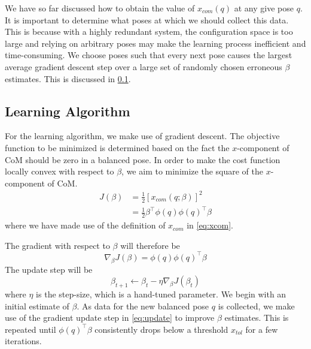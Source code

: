 \documentclass[letterpaper, 10 pt, conference]{ieeeconf}
\begin{document}
We have so far discussed how to obtain the value of $x_{com}(q)$ at any give
pose $q$. It is important to determine what poses at which we should collect
this data. This is because with a highly redundant system, the configuration
space is too large and relying on arbitrary poses may make the learning process
inefficient and time-consuming. We choose poses such that every next pose causes
the largest average gradient descent step over a large set of randomly chosen
erroneous $\beta$ estimates. This is discussed in \cref{subsec: learning}.


\subsection{Learning Algorithm} \label{subsec: learning}

For the learning algorithm, we make use of gradient descent. The objective
function to be minimized is determined based on the fact the $x$-component of
CoM should be zero in a balanced pose. In order to make the cost function
locally convex with respect to $\beta$, we aim to minimize the square of the
$x$-component of CoM.
\begin{align}
    J(\beta) &= \tfrac{1}{2} \left[ x_{com}(q; \beta) \right]^2 \nonumber \\
    &= \tfrac{1}{2} \beta^\top \phi(q) \phi(q)^\top \beta
\end{align}
where we have made use of the definition of $x_{com}$ in \eqref{eq:xcom}.

The gradient with respect to $\beta$ will therefore be
\begin{equation}
    \nabla_\beta J(\beta) = \phi(q) \phi(q)^\top \beta
\end{equation}
The update step will be
\begin{equation}
    \beta_{t+1} \leftarrow \beta_t - \eta \nabla_\beta J(\beta_t)
    \label{eq:update}
\end{equation}
where $\eta$ is the step-size, which is a hand-tuned parameter. We begin with an
initial estimate of $\beta$. As data for the new balanced pose $q$ is collected,
we make use of the gradient update step in \eqref{eq:update} to improve $\beta$
estimates. This is repeated until $\phi(q)^\top \beta$ consistently drops below
a threshold $x_{tol}$ for a few iterations.
\end{document}
